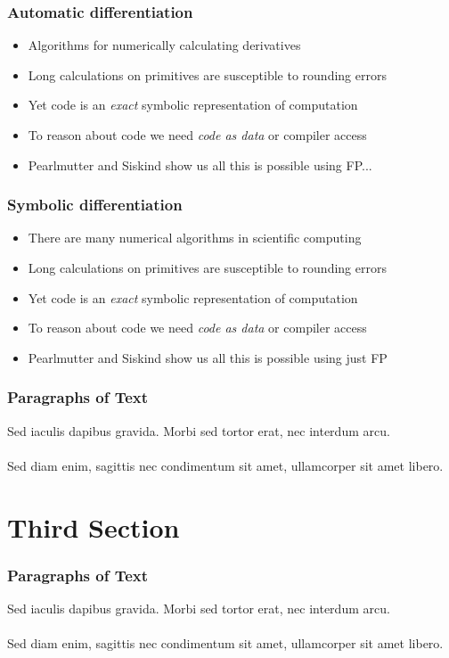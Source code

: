 \documentclass{beamer}
\begin{document}

    \begin{frame}
        \frametitle{Automatic differentiation}
        \begin{itemize}
            \item Algorithms for numerically calculating derivatives
            \item Long calculations on primitives are susceptible to rounding errors
            \item Yet code is an \textit{exact} symbolic representation of computation
            \item To reason about code we need \textit{code as data} or compiler access
            \item Pearlmutter and Siskind show us all this is possible using FP...
        \end{itemize}
    \end{frame}

    \begin{frame}
        \frametitle{Symbolic differentiation}
        \begin{itemize}
            \item There are many numerical algorithms in scientific computing
            \item Long calculations on primitives are susceptible to rounding errors
            \item Yet code is an \textit{exact} symbolic representation of computation
            \item To reason about code we need \textit{code as data} or compiler access
            \item Pearlmutter and Siskind show us all this is possible using just FP
        \end{itemize}
    \end{frame}


    \begin{frame}
        \frametitle{Paragraphs of Text}
        Sed iaculis dapibus gravida. Morbi sed tortor erat, nec interdum arcu. \\~\\

        Sed diam enim, sagittis nec condimentum sit amet, ullamcorper sit amet libero.
    \end{frame}

    \section{Third Section}\label{sec:third-section}
    \begin{frame}
        \frametitle{Paragraphs of Text}
        Sed iaculis dapibus gravida. Morbi sed tortor erat, nec interdum arcu. \\~\\

        Sed diam enim, sagittis nec condimentum sit amet, ullamcorper sit amet libero.
    \end{frame}
\end{document}
